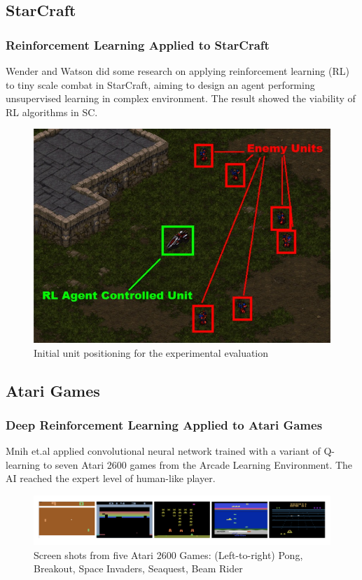 \documentclass{beamer}
\begin{document}
\subsection{StarCraft}
\begin{frame}
  \frametitle{Reinforcement Learning Applied to StarCraft}
  Wender and Watson did some research \cite{6} on applying reinforcement learning (RL) to tiny scale combat in StarCraft, aiming to design an agent performing unsupervised learning in complex environment. The result showed the viability of RL algorithms in SC.
  \begin{figure}
    \includegraphics[width=0.6\linewidth]{figures/sc}
    \caption{ Initial unit positioning for the experimental evaluation}
  \end{figure}
\end{frame}

\subsection{Atari Games}
\begin{frame}
  \frametitle{Deep Reinforcement Learning Applied to Atari Games}
  Mnih et.al \cite{7} applied convolutional neural network trained with a variant of Q-learning to seven Atari 2600 games from the Arcade Learning Environment. The AI reached the expert level of human-like player.
  \begin{figure}
    \includegraphics[width=1\linewidth]{figures/atari}
    \caption{  Screen shots from five Atari 2600 Games: (Left-to-right) Pong, Breakout, Space Invaders, Seaquest, Beam Rider}
  \end{figure}
\end{frame}
\end{document}

